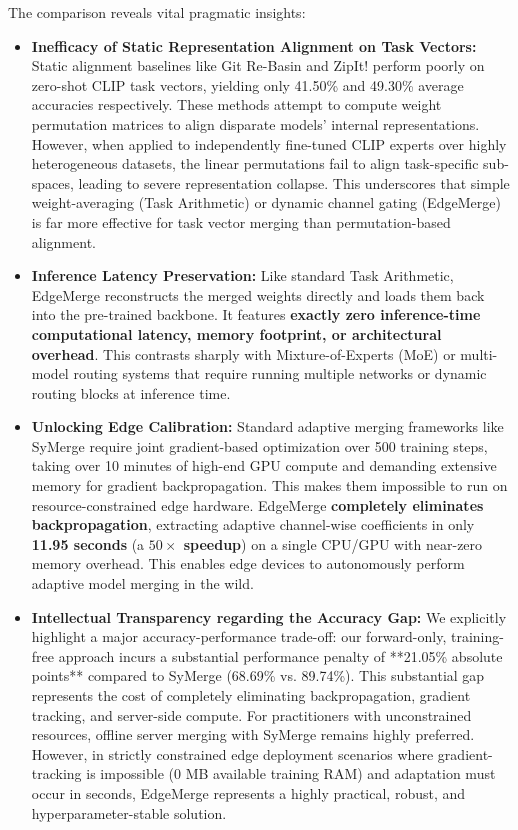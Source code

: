 The comparison reveals vital pragmatic insights:
\begin{itemize}
    \item \textbf{Inefficacy of Static Representation Alignment on Task Vectors:} Static alignment baselines like Git Re-Basin \cite{ainsworth2023git} and ZipIt! \cite{stoica2023zipit} perform poorly on zero-shot CLIP task vectors, yielding only 41.50\% and 49.30\% average accuracies respectively. These methods attempt to compute weight permutation matrices to align disparate models' internal representations. However, when applied to independently fine-tuned CLIP experts over highly heterogeneous datasets, the linear permutations fail to align task-specific sub-spaces, leading to severe representation collapse. This underscores that simple weight-averaging (Task Arithmetic) or dynamic channel gating (EdgeMerge) is far more effective for task vector merging than permutation-based alignment.
    \item \textbf{Inference Latency Preservation:} Like standard Task Arithmetic, EdgeMerge reconstructs the merged weights directly and loads them back into the pre-trained backbone. It features \textbf{exactly zero inference-time computational latency, memory footprint, or architectural overhead}. This contrasts sharply with Mixture-of-Experts (MoE) or multi-model routing systems that require running multiple networks or dynamic routing blocks at inference time.
    \item \textbf{Unlocking Edge Calibration:} Standard adaptive merging frameworks like SyMerge \cite{lu2026symerge} require joint gradient-based optimization over 500 training steps, taking over 10 minutes of high-end GPU compute and demanding extensive memory for gradient backpropagation. This makes them impossible to run on resource-constrained edge hardware. EdgeMerge \textbf{completely eliminates backpropagation}, extracting adaptive channel-wise coefficients in only \textbf{11.95 seconds} (a \textbf{$50\times$ speedup}) on a single CPU/GPU with near-zero memory overhead. This enables edge devices to autonomously perform adaptive model merging in the wild.
    \item \textbf{Intellectual Transparency regarding the Accuracy Gap:} We explicitly highlight a major accuracy-performance trade-off: our forward-only, training-free approach incurs a substantial performance penalty of **21.05\% absolute points** compared to SyMerge (68.69\% vs. 89.74\%). This substantial gap represents the cost of completely eliminating backpropagation, gradient tracking, and server-side compute. For practitioners with unconstrained resources, offline server merging with SyMerge remains highly preferred. However, in strictly constrained edge deployment scenarios where gradient-tracking is impossible (0 MB available training RAM) and adaptation must occur in seconds, EdgeMerge represents a highly practical, robust, and hyperparameter-stable solution.
\end{itemize}
